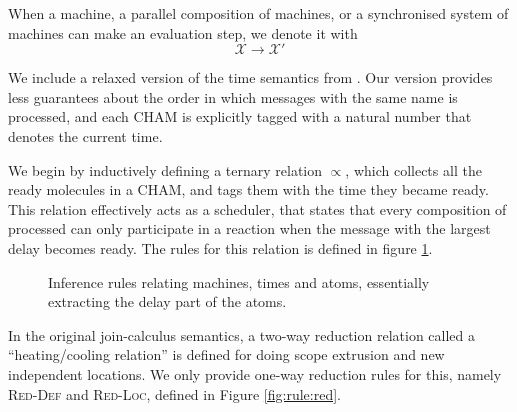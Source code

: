 When a machine, a parallel composition of machines, or a synchronised system of
machines can make an evaluation step, we denote it with
\begin{equation*}
 \boxed{\mathcal{X} \longrightarrow \mathcal{X}'}
\end{equation*}

We include a relaxed version of the time semantics from \cite{timed-join}. Our
version provides less guarantees about the order in which messages with the
same name is processed, and each CHAM is explicitly tagged with a natural
number that denotes the current time.

We begin by inductively defining a ternary relation $\propto$, which collects
all the ready molecules in a CHAM, and tags them with the time they became
ready. This relation effectively acts as a scheduler, that states that every
composition of processed can only participate in a reaction when the message
with the largest delay becomes ready. The rules for this relation is defined in
figure \ref{fig:rule:sched}.

\begin{figure}[!h]
\caption{Inference rules relating machines, times and atoms, essentially
extracting the delay part of the atoms.}
\label{fig:rule:sched}
\end{figure}

In the original join-calculus semantics, a two-way reduction relation called a
``heating/cooling relation'' is defined for doing scope extrusion and new
independent locations. We only provide one-way reduction rules for this, namely
\textsc{Red-Def} and \textsc{Red-Loc}, defined in Figure \ref{fig:rule:red}.

